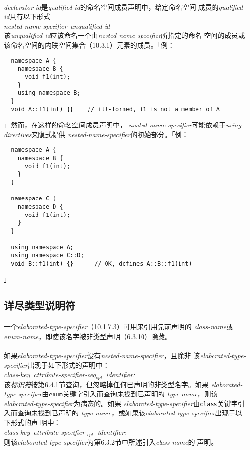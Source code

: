 \paragraph{}
\textit{declarator-id}是\textit{qualified-id}的命名空间成员声明中，给定命名空间
成员的\textit{qualified-id}具有以下形式 \\
\mbox{\qquad \textit{nested-name-specifier unqualified-id}} \\
该\textit{unqualified-id}应该命名一个由\textit{nested-name-specifier}所指定的命名
空间的成员或该命名空间的内联空间集合（10.3.1）元素的成员。「例：
\begin{lstlisting}
  namespace A {
    namespace B {
      void f1(int);
    }
    using namespace B;
  }
  void A::f1(int) {}    // ill-formed, f1 is not a member of A
\end{lstlisting}」然而，在这样的命名空间成员声明中，
\textit{nested-name-specifier}可能依赖于\textit{using-directives}来隐式提供
\textit{nested-name-specifier}的初始部分。「例：
\begin{lstlisting}
  namespace A {
    namespace B {
      void f1(int);
    }
  }

  namespace C {
    namespace D {
      void f1(int);
    }
  }

  using namespace A;
  using namespace C::D;
  void B::f1(int) {}      // OK, defines A::B::f1(int)
\end{lstlisting}」

\subsection{详尽类型说明符}
\paragraph{}
一个\textit{elaborated-type-specifier}（10.1.7.3）可用来引用先前声明的
\textit{class-name}或\textit{enum-name}，即使该名字被非类型声明（6.3.10）隐藏。

\paragraph{}
如果\textit{elaborated-type-specifier}没有\textit{nested-name-specifier}，且除非
该\textit{elaborated-type-specifier}出现于如下形式的声明中：\\
\mbox{\qquad \textit{class-key attribute-specifier-seq$_{opt}$ identifier;}} \\
该\textit{标识符}按第6.4.1节查询，但忽略掉任何已声明的非类型名字。如果
\textit{elaborated-type-specifier}由\texttt{enum}关键字引入而查询未找到已声明的
\textit{type-name}，则该\textit{elaborated-type-specifier}为病态的。如果
\textit{elaborated-type-specifier}由\texttt{class}关键字引入而查询未找到已声明的
\textit{type-name}，或如果该\textit{elaborated-type-specifier}出现于以下形式的声
明中： \\
\mbox{\qquad \textit{class-key attribute-specifier-$_{opt}$ identifier;}} \\
则该\textit{elaborated-type-specifier}为第6.3.2节中所述引入\textit{class-name}的
声明。

